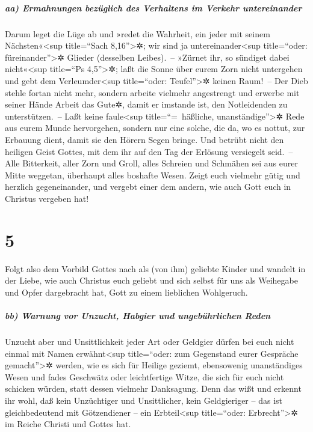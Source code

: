 \hypertarget{aa-ermahnungen-bezuxfcglich-des-verhaltens-im-verkehr-untereinander}{%
\subparagraph{aa) Ermahnungen bezüglich des Verhaltens im Verkehr
untereinander}\label{aa-ermahnungen-bezuxfcglich-des-verhaltens-im-verkehr-untereinander}}

 Darum leget die Lüge ab und »redet die Wahrheit, ein
jeder mit seinem Nächsten«\textless sup title=``Sach
8,16''\textgreater✲; wir sind ja untereinander\textless sup
title=``oder: füreinander''\textgreater✲ Glieder (desselben Leibes).~--
 »Zürnet ihr, so sündiget dabei nicht«\textless sup
title=``Ps 4,5''\textgreater✲; laßt die Sonne über eurem Zorn nicht
untergehen  und gebt dem Verleumder\textless sup
title=``oder: Teufel''\textgreater✲ keinen Raum!~--  Der
Dieb stehle fortan nicht mehr, sondern arbeite vielmehr angestrengt und
erwerbe mit seiner Hände Arbeit das Gute✲, damit er imstande ist, den
Notleidenden zu unterstützen.~--  Laßt keine
faule\textless sup title=``=~häßliche, unanständige''\textgreater✲ Rede
aus eurem Munde hervorgehen, sondern nur eine solche, die da, wo es
nottut, zur Erbauung dient, damit sie den Hörern Segen bringe.
 Und betrübt nicht den heiligen Geist Gottes, mit dem ihr
auf den Tag der Erlösung versiegelt seid.~--  Alle
Bitterkeit, aller Zorn und Groll, alles Schreien und Schmähen sei aus
eurer Mitte weggetan, überhaupt alles boshafte Wesen. 
Zeigt euch vielmehr gütig und herzlich gegeneinander, und vergebt einer
dem andern, wie auch Gott euch in Christus vergeben hat!

\hypertarget{section-4}{%
\section{5}\label{section-4}}

 Folgt also dem Vorbild Gottes nach als (von ihm) geliebte
Kinder  und wandelt in der Liebe, wie auch Christus euch
geliebt und sich selbst für uns als Weihegabe und Opfer dargebracht hat,
Gott zu einem lieblichen Wohlgeruch.

\hypertarget{bb-warnung-vor-unzucht-habgier-und-ungebuxfchrlichen-reden}{%
\subparagraph{bb) Warnung vor Unzucht, Habgier und ungebührlichen
Reden}\label{bb-warnung-vor-unzucht-habgier-und-ungebuxfchrlichen-reden}}

 Unzucht aber und Unsittlichkeit jeder Art oder Geldgier
dürfen bei euch nicht einmal mit Namen erwähnt\textless sup
title=``oder: zum Gegenstand eurer Gespräche gemacht''\textgreater✲
werden, wie es sich für Heilige geziemt,  ebensowenig
unanständiges Wesen und fades Geschwätz oder leichtfertige Witze, die
sich für euch nicht schicken würden, statt dessen vielmehr Danksagung.
 Denn das wißt und erkennt ihr wohl, daß kein Unzüchtiger
und Unsittlicher, kein Geldgieriger -- das ist gleichbedeutend mit
Götzendiener -- ein Erbteil\textless sup title=``oder:
Erbrecht''\textgreater✲ im Reiche Christi und Gottes hat.

